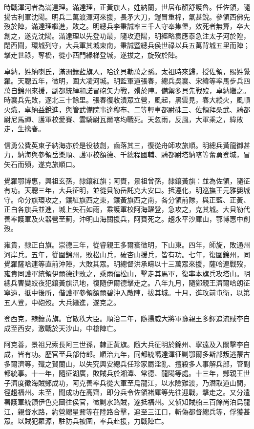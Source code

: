 \begin{pinyinscope}
時戰渾河者為滿達理。滿達理，正黃旗人，姓納蘭，世居布顏舒護魯。任佐領，隨揚古利軍沈陽。明兵二萬渡渾河來援，長矛大刀，鎧冒重棉，氣甚銳。參領西佛先歿於陣，滿達理繼進，敗之。明總兵李秉誠率三千人守奉集堡，效死者無算，卒大創之，遂克沈陽。滿達理以先登功最，隨攻遼陽，明經略袁應泰急注太子河於隍，閉西閘，環城列守，大兵軍其城東南，秉誠暨總兵侯世祿以兵五萬背城五里而陣；擊走世祿，奪橋，從小西門緣梯登城，遂拔之，旋歿於陣。

卓納，姓納喇氏，滿洲鑲藍旗人，哈達貝勒萬之孫。太祖時來歸，授佐領，賜姓覺羅。天聰五年，徵明，圍大凌河城。明監軍道張春，總兵吳襄、宋緯等率馬步兵四萬自錦州來援，副都統綽和諾冒砲矢力戰，殞於陣。備禦多貝先戰歿，卓納繼之。時襄兵先敗，逐北三十餘里。張春復收潰眾立營，風起，黑雲見，春大縱火，風順火熾，卓納益銳進，與管武備院事達穆布、二等輕車都尉硃三、佐領拜桑武、騎都尉尼馬禪、護軍校愛賽、雲騎尉瓦爾喀均戰死。天忽雨，反風，大軍乘之，緯敗走，生擒春。

信勇公費英東子納海亦於是役被創，齒落其三，復從舟師攻旅順。明總兵黃龍御甚力，納海與參領岳樂順、護軍校額德、千總程國輔、騎都尉塔納喀等奮勇登城，冒矢石而殞，遂克旅順口。

覺羅鄂博惠，興祖玄孫，隸鑲紅旗；阿賚，景祖曾孫，隸鑲黃旗：並為佐領，隨征有功。天聰三年，大兵征明，並從貝勒岳託克大安口。抵遵化，明巡撫王元雅嬰城守。命分旗環攻之，鑲紅旗西之東，鑲黃旗西之南，各分領前隊，與正藍、正黃、正白各旗兵並進，城上矢石如雨，乘護軍校阿海躍登，急攻之，克其城。大貝勒代善率護軍及火器營至薊，沖明山海關援兵，阿賚死之。趨永平沙庫山，鄂博惠中創歿。

雍貴，隸正白旗。崇德三年，從睿親王多爾袞徵明，下山東。四年，師旋，敗通州河岸兵。五年，從圍錦州，敗松山兵，破杏山援兵，皆有功。七年，復圍錦州，同覺羅薩哈連等直前沖陣，大敗其眾。明總督洪承疇以十三萬眾來援，薩哈連戰歿，雍貴同護軍統領伊爾德連敗之，乘雨偪松山，擊走其馬軍，復率本旗兵攻塔山。明總兵曹變蛟夜犯鑲黃旗汛地，復隨伊爾德擊走之。八年九月，隨鄭親王濟爾哈朗征寧遠，抵中後所，偕護軍參領額爾碧沖入敵陣，拔其城。十月，進攻前屯衛，以第五人登，中砲歿。大兵繼進，遂克之。

登西克，隸鑲黃旗。官散秩大臣。順治二年，隨揚威大將軍豫親王多鐸追流賊李自成至西安，激戰於天沙山，中槍陣亡。

阿克善，景祖兄索長阿三世孫，隸正黃旗。隨大兵征明於錦州、寧遠及入關擊李自成，皆有功。歷官至兵部侍郎。順治九年，同都統噶達渾征剿鄂爾多斯部叛逃蒙古多爾濟等，殲之賀蘭山，以失究興安總兵任珍家屬淫亂、擅殺多人事解兵部，管副都統事。十一年，隨征湖廣，敗賊兵於湘潭、常德、龍陽等處。十三年，鄭親王世子濟度徵海賊鄭成功，阿克善率兵從大軍至烏龍江，以水險難渡，乃潛取道山間，徑趨福州。未至，聞成功在高齊，即分兵令佐領褚庫等先往迎戰，擊走之。又分遣署護軍統領伊色克圖往侯官，徵剿水路賊，遂抵福州。又偵知賊船三百餘尚泊烏龍江，親督水路，約營總星鼐等在陸路合擊，追至三江口，斬偽都督總兵等，俘獲甚眾。以賊犯羅源，駐防兵被圍，率兵赴援，力戰陣亡。


\end{pinyinscope}
